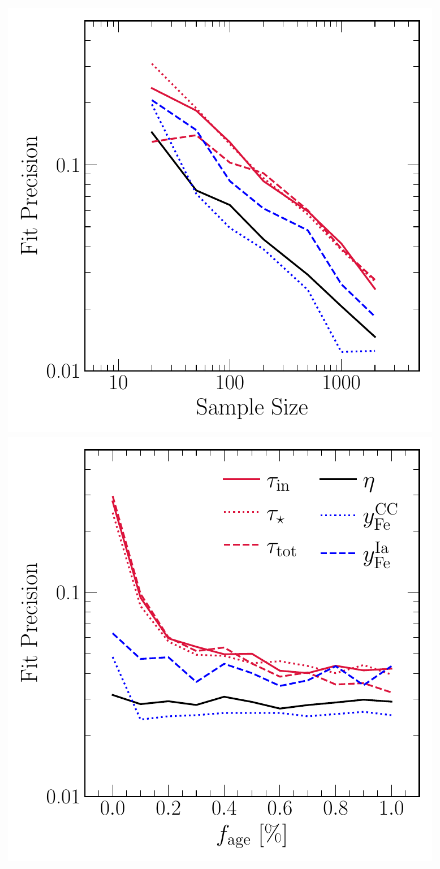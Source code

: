 \documentclass[ms.tex]{subfiles}
\begin{document}
\begin{figure}
\centering
\includegraphics[scale = 0.55]{precision_samplesize.pdf}
\includegraphics[scale = 0.55]{precision_agefrac.pdf}

\end{figure}
\end{document}
